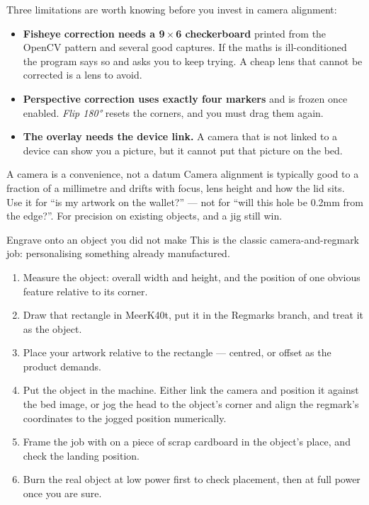 \noindent Three limitations are worth knowing before you invest in camera
alignment:

\begin{itemize}
  \item \textbf{Fisheye correction needs a 9\,$\times$\,6 checkerboard} printed
        from the OpenCV pattern and several good captures. If the maths is
        ill-conditioned the program says so and asks you to keep trying. A cheap
        lens that cannot be corrected is a lens to avoid.
  \item \textbf{Perspective correction uses exactly four markers} and is frozen
        once enabled. \emph{Flip 180°} resets the corners, and you must drag them
        again.
  \item \textbf{The overlay needs the device link.} A camera that is not linked
        to a device can show you a picture, but it cannot put that picture on the
        bed.
\end{itemize}

\begin{machinebox}{A camera is a convenience, not a datum}
Camera alignment is typically good to a fraction of a millimetre and drifts with
focus, lens height and how the lid sits. Use it for ``is my artwork on the
wallet?'' --- not for ``will this hole be 0.2\unit{mm} from the edge?''. For
precision on existing objects,  and a jig still win.
\end{machinebox}

\begin{tryit}{Engrave onto an object you did not make}
This is the classic camera-and-regmark job: personalising something already
manufactured.
\begin{enumerate}[label=\arabic*.,leftmargin=1.4em]
  \item Measure the object: overall width and height, and the position of one
        obvious feature relative to its corner.
  \item Draw that rectangle in MeerK40t, put it in the Regmarks branch, and treat
        it as the object.
  \item Place your artwork relative to the rectangle --- centred, or offset as the
        product demands.
  \item Put the object in the machine. Either link the camera and position it
        against the bed image, or jog the head to the object's corner and align
        the regmark's coordinates to the jogged position numerically.
  \item Frame the job with  on a piece of scrap cardboard in the
        object's place, and check the landing position.
  \item Burn the real object at low power first to check placement, then at full
        power once you are sure.
\end{enumerate}
\end{tryit}
